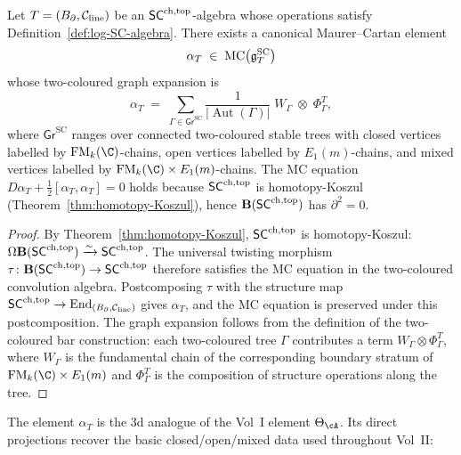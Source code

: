 \begin{theorem}
\label{thm:3d-universal-mc}
Let $T = (B_{\partial}, \mathcal C_{\mathrm{line}})$ be an $\mathsf{SC}^{\mathrm{ch,top}}$-algebra
whose operations satisfy
Definition~\ref{def:log-SC-algebra}. There exists a canonical
Maurer--Cartan element
\begin{equation}\label{eq:alpha-T}
\alpha_T
\;\in\;
\operatorname{MC}\bigl(\mathfrak{g}^{\mathrm{SC}}_T\bigr)
\end{equation}
whose two-coloured graph expansion is
\[
\alpha_T
\;=\;
\sum_{\Gamma \in \mathsf{Gr}^{\mathrm{SC}}}
\frac{1}{|\operatorname{Aut}(\Gamma)|}
\;W_\Gamma\;\otimes\;\Phi_\Gamma^T,
\]
where $\mathsf{Gr}^{\mathrm{SC}}$ ranges over connected
two-coloured stable trees with closed vertices labelled by
$\FM_k(\C)$-chains, open vertices labelled by $E_1(m)$-chains,
and mixed vertices labelled by $\FM_k(\C) \times E_1(m)$-chains.
The MC equation
$D\alpha_T + \tfrac{1}{2}[\alpha_T, \alpha_T] = 0$
holds because $\mathsf{SC}^{\mathrm{ch,top}}$ is homotopy-Koszul
\textup{(}Theorem~\textup{\ref{thm:homotopy-Koszul}}\textup{)},
hence $\mathbf{B}(\mathsf{SC}^{\mathrm{ch,top}})$ has $\partial^2 = 0$.
\end{theorem}

\begin{proof}
By Theorem~\ref{thm:homotopy-Koszul}, $\mathsf{SC}^{\mathrm{ch,top}}$ is homotopy-Koszul:
$\Omega\mathbf{B}(\mathsf{SC}^{\mathrm{ch,top}}) \xrightarrow{\sim} \mathsf{SC}^{\mathrm{ch,top}}$. The universal
twisting morphism
$\tau\colon \mathbf{B}(\mathsf{SC}^{\mathrm{ch,top}}) \to \mathsf{SC}^{\mathrm{ch,top}}$ therefore satisfies the
MC equation in the two-coloured convolution algebra. Postcomposing
$\tau$ with the structure map $\mathsf{SC}^{\mathrm{ch,top}} \to \operatorname{End}_{(B_{\partial},
\mathcal C_{\mathrm{line}})}$ gives $\alpha_T$, and the MC equation is
preserved under this postcomposition. The graph expansion follows
from the definition of the two-coloured bar construction: each
two-coloured tree $\Gamma$ contributes a term $W_\Gamma \otimes
\Phi_\Gamma^T$, where $W_\Gamma$ is the fundamental chain of the
corresponding boundary stratum of $\FM_k(\C) \times E_1(m)$ and
$\Phi_\Gamma^T$ is the composition of structure operations along
the tree.
\end{proof}

The element $\alpha_T$ is the 3d analogue of the Vol~I element
$\Theta_\cA$. Its direct projections recover the basic
closed/open/mixed data used throughout Vol~II:

